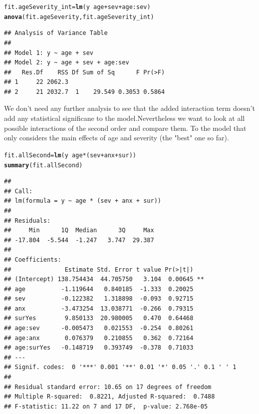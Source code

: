 \documentclass{article}\usepackage[]{graphicx}\usepackage[]{color}
\makeatletter
\newcommand{\hlopt}[1]{\textcolor[rgb]{0,0,0}{#1}}%
\newcommand{\hlstd}[1]{\textcolor[rgb]{0.345,0.345,0.345}{#1}}%
\newcommand{\hlkwb}[1]{\textcolor[rgb]{0.69,0.353,0.396}{#1}}%
\newcommand{\hlkwd}[1]{\textcolor[rgb]{0.737,0.353,0.396}{\textbf{#1}}}%
\newenvironment{kframe}{%
 \def\at@end@of@kframe{}%
 \ifinner\ifhmode%
  \def\at@end@of@kframe{\end{minipage}}%
  \begin{minipage}{\columnwidth}%
 \fi\fi%
 \def\FrameCommand##1{\hskip\@totalleftmargin \hskip-\fboxsep
 \colorbox{shadecolor}{##1}\hskip-\fboxsep
     \hskip-\linewidth \hskip-\@totalleftmargin \hskip\columnwidth}%
 \MakeFramed {\advance\hsize-\width
   \@totalleftmargin\z@ \linewidth\hsize
   \@setminipage}}%
 {\par\unskip\endMakeFramed%
 \at@end@of@kframe}
\newenvironment{knitrout}{}{} %
\makeatother
\begin{document}
\begin{knitrout}
\color{fgcolor}\begin{kframe}
\begin{alltt}
\hlstd{fit.ageSeverity_int} \hlkwb{=} \hlkwd{lm}\hlstd{(y} \hlopt{~} \hlstd{age} \hlopt{+} \hlstd{sev} \hlopt{+} \hlstd{age}\hlopt{:}\hlstd{sev)}
\hlkwd{anova}\hlstd{(fit.ageSeverity, fit.ageSeverity_int)}
\end{alltt}
\begin{verbatim}
## Analysis of Variance Table
## 
## Model 1: y ~ age + sev
## Model 2: y ~ age + sev + age:sev
##   Res.Df    RSS Df Sum of Sq      F Pr(>F)
## 1     22 2062.3                           
## 2     21 2032.7  1    29.549 0.3053 0.5864
\end{verbatim}
\end{kframe}
\end{knitrout}
We don't need any further analysis to see that the added interaction term doesn't add any statistical significane to the model.Nevertheless we want to look at all possible interactions of the second order and compare them. To the model that only considers the main effects of age and severity (the "best" one so far).
\clearpage
\begin{knitrout}
\color{fgcolor}\begin{kframe}
\begin{alltt}
\hlstd{fit.allSecond} \hlkwb{=} \hlkwd{lm}\hlstd{(y} \hlopt{~} \hlstd{age}\hlopt{*}\hlstd{(sev} \hlopt{+} \hlstd{anx} \hlopt{+} \hlstd{sur))}
\hlkwd{summary}\hlstd{(fit.allSecond)}
\end{alltt}
\begin{verbatim}
## 
## Call:
## lm(formula = y ~ age * (sev + anx + sur))
## 
## Residuals:
##     Min      1Q  Median      3Q     Max 
## -17.804  -5.544  -1.247   3.747  29.387 
## 
## Coefficients:
##               Estimate Std. Error t value Pr(>|t|)   
## (Intercept) 138.754434  44.705750   3.104  0.00645 **
## age          -1.119644   0.840185  -1.333  0.20025   
## sev          -0.122382   1.318898  -0.093  0.92715   
## anx          -3.473254  13.038771  -0.266  0.79315   
## surYes        9.850133  20.980005   0.470  0.64468   
## age:sev      -0.005473   0.021553  -0.254  0.80261   
## age:anx       0.076379   0.210855   0.362  0.72164   
## age:surYes   -0.148719   0.393749  -0.378  0.71033   
## ---
## Signif. codes:  0 '***' 0.001 '**' 0.01 '*' 0.05 '.' 0.1 ' ' 1
## 
## Residual standard error: 10.65 on 17 degrees of freedom
## Multiple R-squared:  0.8221,	Adjusted R-squared:  0.7488 
## F-statistic: 11.22 on 7 and 17 DF,  p-value: 2.768e-05
\end{verbatim}
\end{kframe}
\end{knitrout}
\end{document}
